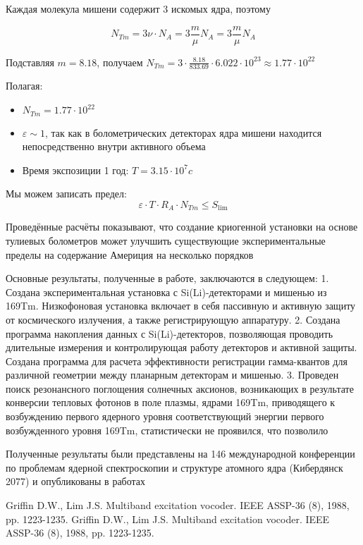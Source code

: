 \documentclass[a4paper,article,14pt]{extarticle}
\begin{document}
Каждая молекула мишени содержит 3 искомых ядра, поэтому

\begin{equation}
    N_{Tm} = 3\nu  \cdot {N_A} = 3\frac{m}{\mu }{N_A} = 3\frac{m}{\mu }{N_A}
\end{equation}

Подставляя $m=
8.18$, получаем ${N_{Tm}} = 3 \cdot \frac{{8.18}}{{833.69}} \cdot 6.022 \cdot {10^{23}} \approx 1.77 \cdot {10^{22}}$



Полагая:
\begin{itemize}
    \item $N_{Tm} = 1.77 \cdot {10^{22}}$
    \item $\varepsilon \sim 1 $, так как в болометрических детекторах ядра мишени находится непосредственно внутри активного объема
    \item Время экспозиции 1 год: $T = 3.15 \cdot {10^7} c$
\end{itemize}

Мы можем записать предел:
\begin{equation}
   \varepsilon  \cdot T \cdot {R_A} \cdot N_{Tm} \leqslant {S_{\lim }}
\end{equation}


\newpage

Проведённые расчёты показывают, что создание криогенной установки на основе тулиевых болометров может улучшить существующие экспериментальные пределы на содержание Америция на несколько порядков
\pagebreak

Основные результаты, полученные в работе, заключаются в
следующем:
1. Создана экспериментальная установка с Si(Li)-детекторами и
мишенью из 169Tm. Низкофоновая установка включает в себя пассивную и
активную защиту от космического излучения, а также регистрирующую
аппаратуру.
2. Создана программа накопления данных с Si(Li)-детекторов,
позволяющая проводить длительные измерения и контролирующая работу
детекторов и активной защиты. Создана программа для расчета
эффективности регистрации гамма-квантов для различной геометрии между
планарным детекторам и мишенью.
3. Проведен поиск резонансного поглощения солнечных аксионов,
возникающих в результате конверсии тепловых фотонов в поле плазмы,
ядрами 169Tm, приводящего к возбуждению первого ядерного уровня  соответствующий энергии первого
возбужденного уровня 169Tm, статистически не проявился, что позволило

Полученные результаты были представлены на 146 международной
конференции по проблемам ядерной спектроскопии и структуре атомного
ядра (Кибердянск 2077) и опубликованы в работах



\begin{thebibliography}{1}
 Griffin D.W., Lim J.S. \flqq Multiband excitation vocoder\frqq. IEEE ASSP-36 (8), 1988, pp. 1223-1235.
 Griffin D.W., Lim J.S. \flqq Multiband excitation vocoder\frqq. IEEE ASSP-36 (8), 1988, pp. 1223-1235.
\end{thebibliography}
\end{document}
